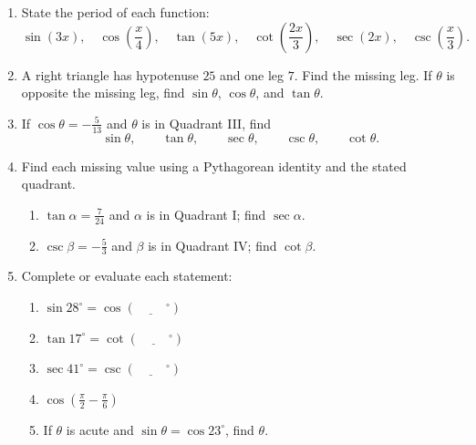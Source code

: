 \documentclass[12pt]{article}
\begin{document}
\begin{enumerate}[leftmargin=*,itemsep=1em,topsep=0.8em]
  \item State the period of each function:
  \[
  \sin(3x),\quad
  \cos\left(\frac{x}{4}\right),\quad
  \tan(5x),\quad
  \cot\left(\frac{2x}{3}\right),\quad
  \sec(2x),\quad
  \csc\left(\frac{x}{3}\right).
  \]

  \item A right triangle has hypotenuse $25$ and one leg $7$. Find the missing leg. If $\theta$ is opposite the missing leg, find $\sin\theta$, $\cos\theta$, and $\tan\theta$.

  \item If $\cos\theta=-\frac{5}{13}$ and $\theta$ is in Quadrant III, find
  \[
  \sin\theta,\qquad \tan\theta,\qquad \sec\theta,\qquad \csc\theta,\qquad \cot\theta.
  \]

  \item Find each missing value using a Pythagorean identity and the stated quadrant.
  \begin{enumerate}[label=(\alph*)]
    \item $\tan\alpha=\frac{7}{24}$ and $\alpha$ is in Quadrant I; find $\sec\alpha$.
    \item $\csc\beta=-\frac53$ and $\beta$ is in Quadrant IV; find $\cot\beta$.
  \end{enumerate}

  \item Complete or evaluate each statement:
  \begin{enumerate}[label=(\alph*)]
    \item $\sin 28^\circ=\cos(\underline{\hspace{1cm}}^\circ)$
    \item $\tan 17^\circ=\cot(\underline{\hspace{1cm}}^\circ)$
    \item $\sec 41^\circ=\csc(\underline{\hspace{1cm}}^\circ)$
    \item $\displaystyle \cos\left(\frac\pi2-\frac\pi6\right)$
    \item If $\theta$ is acute and $\sin\theta=\cos23^\circ$, find $\theta$.
  \end{enumerate}
\end{enumerate}

\newpage
\end{document}
